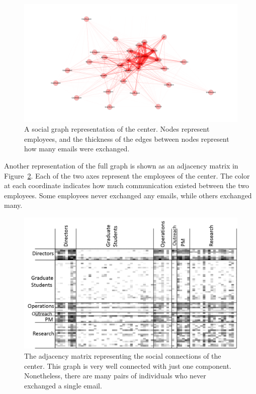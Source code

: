 \documentclass[12pt]{report}
\begin{document}
\begin{figure}[t]
    \centering
    \includegraphics[width=\columnwidth,trim={4mm .5mm 0mm 5mm},clip]{HumeGraph2}
    \vspace{-17pt}
    \caption[The social network of the center]{A social graph representation of the center.  Nodes represent employees, and the thickness of the edges between nodes represent how many emails were exchanged.}
    \label{fig:social_net}
\end{figure}

Another representation of the full graph is shown as an adjacency matrix in Figure~\ref{fig:adj_matrix}.
Each of the two axes represent the employees of the center.
The color at each coordinate indicates how much communication existed between the two employees.
Some employees never exchanged any emails, while others exchanged many.

\begin{figure}[t]
    \centering
    \includegraphics[width=\columnwidth,trim={4mm .5mm 0mm 5mm},clip]{adj_matrix}
    \vspace{-17pt}
    \caption[The dataset represented as an adjacency matrix]{The adjacency matrix representing the social connections of the center.  This graph is very well connected with just one component.  Nonetheless, there are many pairs of individuals who never exchanged a single email.}
    \label{fig:adj_matrix}
\end{figure}
\end{document}
